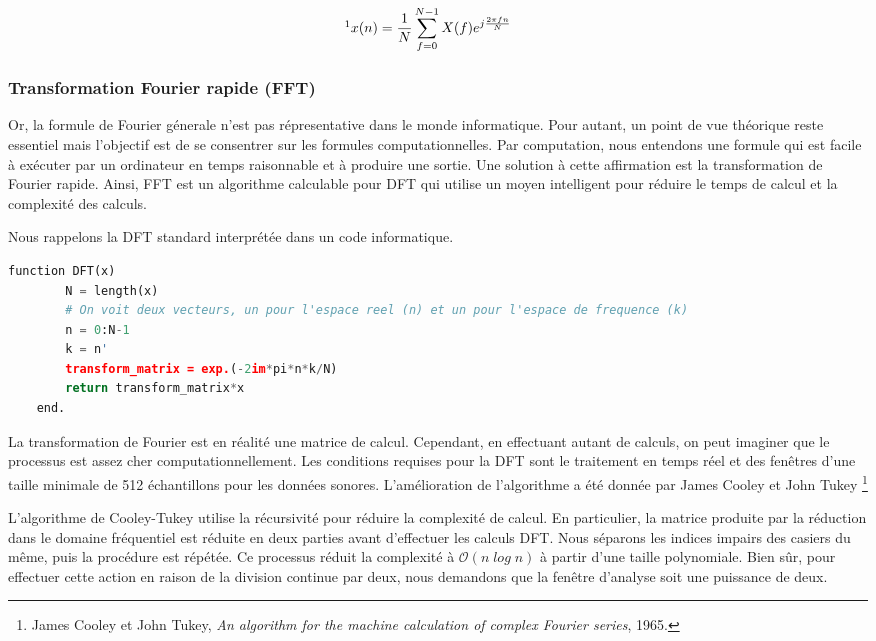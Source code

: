 \begin{equation}
\footnote{Alan V. Oppenheim et Ronald W. Schafer, \textit{Discrete-time signal processing}, 2009. [pp. 822 - 835] \nocite{Sch09} }
    x(n) = \frac{1}{N} \sum_{ f = 0} ^ {N-1} X(f) e ^ {j \frac{2 \pi f n}{N}} \hspace{5mm} 
\end{equation}

    \subsubsection{Transformation Fourier rapide (FFT)}

Or, la formule de Fourier génerale n'est pas répresentative dans le monde informatique. Pour autant, un point de vue théorique reste essentiel mais l'objectif est de se consentrer sur les formules computationnelles. Par computation, nous entendons une formule qui est facile à exécuter par un ordinateur en temps raisonnable et à produire une sortie. Une solution à cette affirmation est la transformation de Fourier rapide. Ainsi, FFT est un algorithme calculable pour DFT qui utilise un moyen intelligent pour réduire le temps de calcul et la complexité des calculs.

Nous rappelons la DFT standard interprétée dans un code informatique.

\noindent\begin{minipage}{\textwidth}
    \begin{lstlisting}[language=Python, caption= DFT]
    function DFT(x)
        N = length(x)
        # On voit deux vecteurs, un pour l'espace reel (n) et un pour l'espace de frequence (k) 
        n = 0:N-1
        k = n'
        transform_matrix = exp.(-2im*pi*n*k/N)
        return transform_matrix*x
    end.
    \end{lstlisting}
\end{minipage}

La transformation de Fourier est en réalité une matrice de calcul. Cependant, en effectuant autant de calculs, on peut imaginer que le processus est assez cher computationnellement. Les conditions requises pour la DFT sont le traitement en temps réel et des fenêtres d’une taille minimale de 512 échantillons pour les données sonores. L'amélioration de l'algorithme a été donnée par James Cooley et John Tukey \footnote{James Cooley et John Tukey, \textit{An algorithm for the machine calculation of complex Fourier series}, 1965. \nocite{Fourier_complex}}
 
L'algorithme de Cooley-Tukey utilise la récursivité pour réduire la complexité de calcul. En particulier, la matrice produite par la réduction dans le domaine fréquentiel est réduite en deux parties avant d'effectuer les calculs DFT. Nous séparons les indices impairs des casiers du même, puis la procédure est répétée. Ce processus réduit la complexité à $ \mathcal{O} (n \; log \; n) $ à partir d’une taille polynomiale. Bien sûr, pour effectuer cette action en raison de la division continue par deux, nous demandons que la fenêtre d’analyse soit une puissance de deux.

